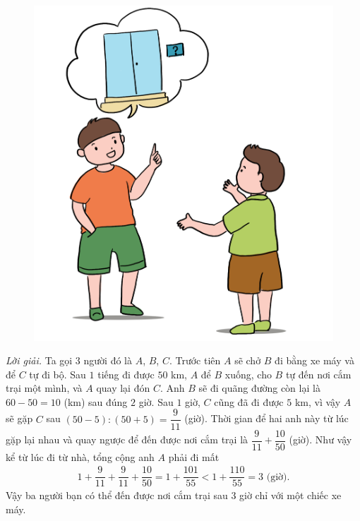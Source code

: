 \begin{multicols}{2}
	\begin{figure}[H]
		\centering
		\vspace*{-15pt}
		\captionsetup{labelformat= empty, justification=centering}
		\includegraphics[width=0.95\linewidth]{Pi10_ToanBi_Bai3}
		\vspace*{-15pt}
	\end{figure}
	\textit{Lời giải.} 	Ta gọi $3$ người đó là $A$, $B$, $C$. Trước tiên $A$ sẽ chở $B$ đi bằng xe máy và để $C$ tự đi bộ. Sau $1$ tiếng đi được $50$ km, $A$ để $B$ xuống, cho $B$ tự đến nơi cắm trại một mình, và $A$ quay lại đón $C$. Anh $B$ sẽ đi quãng đường còn lại là $60 -50 =10$ (km) sau đúng $2$ giờ. Sau $1$ giờ, $C$ cũng đã đi được $5$ km, vì vậy $A$ sẽ gặp $C$ sau $(50-5):(50+5)= \dfrac{9}{11}$ (giờ). Thời gian để hai anh này từ lúc gặp lại nhau và quay ngược để đến được nơi cắm trại là $\dfrac{9}{11}+\dfrac{10}{50}$ (giờ).
	\vskip 0.1cm
	Như vậy kể từ lúc đi từ nhà, tổng cộng anh $A$ phải đi mất
	\begin{align*}
		1\!\!+\!\!\dfrac{9}{11}\!\!+\!\!  \dfrac{9}{11}\!\!+\!\!\dfrac{10}{50}  \!=\!\! 1\!\!+\!\!\dfrac{101}{55}\!\!<\!\!1\!\!+\!\!\dfrac{110}{55}\!=\!\!3  \text{ (giờ)}.
	\end{align*}
	Vậy ba người bạn có thể đến được nơi cắm trại sau $3$ giờ chỉ với một chiếc xe máy.

\end{multicols}
